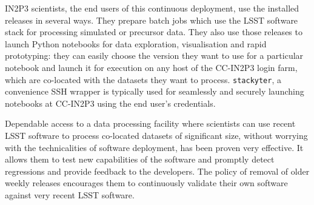 IN2P3 scientists, the end users of this continuous deployment, use the installed releases in several ways. They prepare batch jobs which use the LSST software stack for processing simulated or precursor data. They also use those releases to launch Python notebooks for data exploration, visualisation and rapid prototyping: they can easily choose the version they want to use for a particular notebook and launch it for execution on any host of the CC-IN2P3 login farm, which are co-located with the datasets they want to process.
\texttt{stackyter}\cite{stackyter}, a convenience SSH wrapper is typically used for seamlessly and securely launching notebooks at CC-IN2P3 using the end user's credentials.

Dependable access to a data processing facility where scientists can use recent LSST software to process co-located datasets of significant size, without worrying with the technicalities of software deployment, has been proven very effective. It allows them to test new capabilities of the software and promptly detect regressions and provide feedback to the developers. The policy of removal of older weekly releases encourages them to continuously validate their own software against very recent LSST software.
